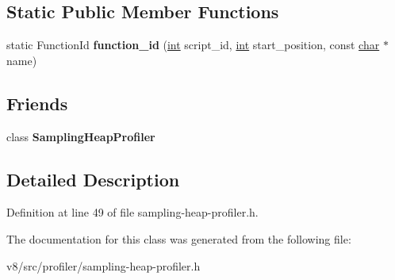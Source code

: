 \subsection*{Static Public Member Functions}
\begin{DoxyCompactItemize}
\item 
\mbox{\label{classv8_1_1internal_1_1SamplingHeapProfiler_1_1AllocationNode_aab1b9429762149c13209bdf3ea9f045c}} 
static Function\+Id {\bfseries function\+\_\+id} (\mbox{\hyperlink{classint}{int}} script\+\_\+id, \mbox{\hyperlink{classint}{int}} start\+\_\+position, const \mbox{\hyperlink{classchar}{char}} $\ast$name)
\end{DoxyCompactItemize}
\subsection*{Friends}
\begin{DoxyCompactItemize}
\item 
\mbox{\label{classv8_1_1internal_1_1SamplingHeapProfiler_1_1AllocationNode_a1c4268235229c6a40ca92cbcd4591c9b}} 
class {\bfseries Sampling\+Heap\+Profiler}
\end{DoxyCompactItemize}


\subsection{Detailed Description}


Definition at line 49 of file sampling-\/heap-\/profiler.\+h.



The documentation for this class was generated from the following file\+:\begin{DoxyCompactItemize}
\item 
v8/src/profiler/sampling-\/heap-\/profiler.\+h\end{DoxyCompactItemize}
